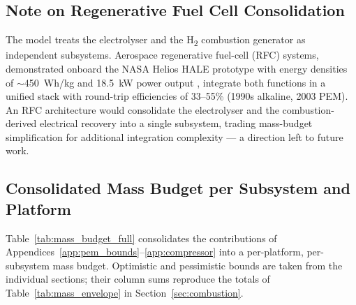 \documentclass[applsci,article,submit,pdftex,moreauthors]{Definitions/mdpi}
\begin{document}
\subsection{Note on Regenerative Fuel Cell Consolidation}
\label{app:rfc_future}

The model treats the electrolyser and the H\textsubscript{2} combustion generator as independent subsystems. Aerospace regenerative fuel-cell (RFC) systems, demonstrated onboard the NASA Helios HALE prototype with energy densities of $\sim$450~Wh/kg and 18.5~kW power output \cite{Shahzad2025URFC}, integrate both functions in a unified stack with round-trip efficiencies of 33--55\% (1990s alkaline, 2003 PEM). An RFC architecture would consolidate the electrolyser and the combustion-derived electrical recovery into a single subsystem, trading mass-budget simplification for additional integration complexity --- a direction left to future work.

\subsection{Consolidated Mass Budget per Subsystem and Platform}
\label{app:mass_budget_full}

Table~\ref{tab:mass_budget_full} consolidates the contributions of Appendices~\ref{app:pem_bounds}--\ref{app:compressor} into a per-platform, per-subsystem mass budget. Optimistic and pessimistic bounds are taken from the individual sections; their column sums reproduce the totals of Table~\ref{tab:mass_envelope} in Section~\ref{sec:combustion}.
\end{document}
